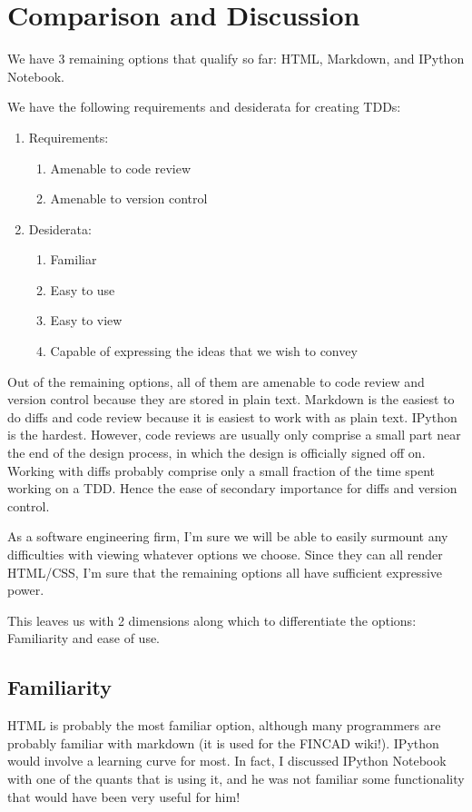 \documentclass[]{article}
\begin{document}
		


\section{Comparison and Discussion}
We have 3 remaining options that qualify so far: HTML, Markdown, and IPython Notebook.

We have the following requirements and desiderata for creating TDDs:

\begin{enumerate}
	\item Requirements:
		\begin{enumerate}
			\item Amenable to code review
			\item Amenable to version control
		\end{enumerate}
	\item Desiderata:
		\begin{enumerate}
			\item Familiar
			\item Easy to use
			\item Easy to view
			\item Capable of expressing the ideas that we wish to convey			
		\end{enumerate}
\end{enumerate}

Out of the remaining options, all of them are amenable to code review and version control because they are stored in plain text.  Markdown is the easiest to do diffs and code review because it is easiest to work with as plain text.  IPython is the hardest.  However, code reviews are usually only comprise a small part near the end of the design process, in which the design is officially signed off on.  Working with diffs probably comprise only a small fraction of the time spent working on a TDD.  Hence the ease of secondary importance for diffs and version control.

As a software engineering firm, I'm sure we will be able to easily surmount any difficulties with viewing whatever options we choose.  Since they can all render HTML/CSS, I'm sure that the remaining options all have sufficient expressive power.

This leaves us with 2 dimensions along which to differentiate the options: Familiarity and ease of use.


\subsection{Familiarity}
HTML is probably the most familiar option, although many programmers are probably familiar with markdown 
(it is used for the FINCAD wiki!).  IPython would involve a learning curve for most.  In fact, I discussed 
IPython Notebook with one of the quants that is using it, and he was not familiar some functionality that 
would have been very useful for him!
\end{document}
